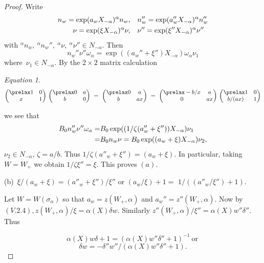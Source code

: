 \documentclass{memo-l}
\theoremstyle{definition}
\theoremstyle{remark}
\newtheorem{eqn}[theorem]{Equation}
\numberwithin{section}{chapter}
\numberwithin{equation}{chapter}
\begin{document}
\begin{proof}  Write
$$
\aligned
n_{w} = \exp(a_{w}X_{-{\alpha}})^{{\alpha}}n_{w}, \quad &
n_{w}'' = \exp(a_{w}''X_{-{\alpha}})^{{\alpha}}n_{w}'' \\
{\nu} = \exp({\xi}X_{-{\alpha}})^{{\alpha}}{\nu}, \quad &
{\nu}'' = \exp({\xi}''X_{-{\alpha}})^{{\alpha}}{\nu}''
\endaligned
$$
with ${}^{{\alpha}}n_{w},\ {}^{{\alpha}}n_{w}'',\ {}^{{\alpha}}{\nu},\
{}^{{\alpha}}{\nu}''  \in  N_{-{\alpha}}$.  Then
$$
n_{w}''{\nu}''{\omega}_{{\alpha}} =
\exp((a_{w}''+{\xi}'')X_{-{\alpha}}){\omega}_{{\alpha}}{\nu}_{1}
$$
where\ ${\nu}_{1}  \in  N_{-{\alpha}}$.  By the $2\times 2$ matrix calculation

\medpagebreak

\begin{eqn} %
$$
{\begin{pmatrix} \prelax  1 & 0 \\ x & 1 \end{pmatrix}}\
{\begin{pmatrix} \prelax  0 & a \\ b & 0 \end{pmatrix}}\ =\
{\begin{pmatrix} \prelax
 0 & a \\ b & ax \end{pmatrix}}\ =\
{\begin{pmatrix} \prelax
 -b/x & a \\ 0 & ax \end{pmatrix}}\
{\begin{pmatrix} \prelax
 1 & 0 \\ b/(ax) & 1 \end{pmatrix}}
$$
\end{eqn}
we see that $$\aligned
B_{0}n''_{w}{\nu''}{\omega}_{{\alpha}} =&
B_{0}\exp((1/{\zeta}(a''_{w}+{\xi''}))X_{-{\alpha}}){\nu}_{1}\\
=& B_{0}n_{w}{\nu}
=  B_{0}\exp((a_{w}+{\xi})X_{-{\alpha}}){\nu}_{2},\endaligned$$
${\nu}_{2}  \in
N_{-{\alpha}}$, ${\zeta} = a/b$.  Thus $1/{\zeta}(a''_{w}+{\xi''}) =
(a_{w}+{\xi})$.  In particular, taking $W = W_{+}$ we obtain $1/{\zeta}{\xi''}
= {\xi}$.  This proves $(a)$.

   (b)\  ${\xi}/(a_{w}+{\xi}) = (a''_{w}+{\xi''})/{\xi''}$ or $(a_{w}/{\xi}) + 1 =$
$1/((a''_{w}/{\xi''}) + 1).$

Let $W = W({\sigma}_{{\alpha}})$ so that $a_{w} = z(W_{+},{\alpha})$ and
$a_{w}'' = z''(W_{+},{\alpha})$.  Now by $(V.2.4), z(W_{+},{\alpha})/{\xi} =
{\alpha}(X){\delta}w$.  Similarly $z''(W_{+},{\alpha})/{\xi}'' =
{\alpha}(X)w''{\delta}''$.  Thus

$$
{\alpha}(X)w{\delta} + 1 = ({\alpha}(X)w''{\delta}'' + 1)^{-1}\  {\text{or}}\
$$
$$
{\delta}w = -{\delta}''w''/({\alpha}(X)w''{\delta}'' + 1) .
$$
\end{proof}
\end{document}
